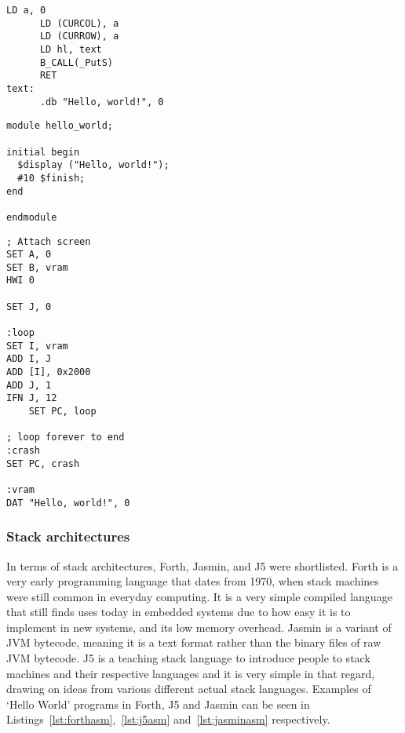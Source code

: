 \noindent\begin{minipage}{0.5\textwidth}
\begin{lstlisting}[caption={Z80 ASM},label={lst:z80asm}]
      LD a, 0
      LD (CURCOL), a
      LD (CURROW), a
      LD hl, text
      B_CALL(_PutS)
      RET
text:
      .db "Hello, world!", 0
\end{lstlisting}%
\end{minipage}%
\noindent\begin{minipage}{0.5\textwidth}
\begin{lstlisting}[caption={Picoblaze ASM},label={lst:picoasm}]
module hello_world;

initial begin
  $display ("Hello, world!");
  #10 $finish;
end

endmodule
\end{lstlisting}%
\end{minipage}

\noindent\begin{minipage}{\linewidth} %
\begin{lstlisting}[caption={DCPU-16 ASM}, label={lst:dcpuasm}]
; Attach screen
SET A, 0
SET B, vram
HWI 0

SET J, 0

:loop
SET I, vram
ADD I, J
ADD [I], 0x2000
ADD J, 1
IFN J, 12
    SET PC, loop

; loop forever to end
:crash
SET PC, crash

:vram
DAT "Hello, world!", 0
\end{lstlisting}%
\end{minipage}

\subsubsection{Stack architectures}

In terms of stack architectures, Forth, Jasmin, and J5 were shortlisted. Forth
is a very early programming language that dates from 1970, when stack machines
were still common in everyday computing. It is a very simple compiled language
that still finds uses today in embedded systems due to how easy it is to
implement in new systems, and its low memory overhead. Jasmin is a variant of
JVM bytecode, meaning it is a text format rather than the binary files of raw
JVM bytecode. J5 is a teaching stack language to introduce people to stack
machines and their respective languages and it is very simple in that regard,
drawing on ideas from various different actual stack languages. Examples of
`Hello World' programs in Forth, J5 and Jasmin can be seen in
Listings~\ref{lst:forthasm},~\ref{lst:j5asm} and~\ref{lst:jasminasm}
respectively.

